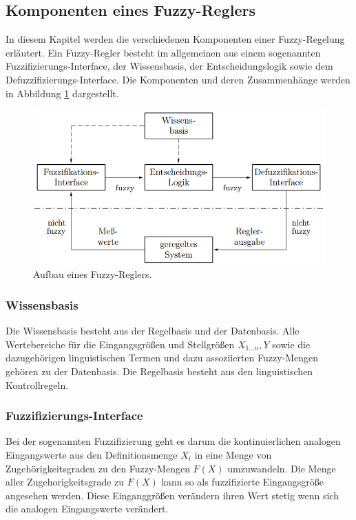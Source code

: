 \documentclass[12pt,a4paper,bibliography=totocnumbered,listof=totocnumbered, abstracton]{scrartcl}
\theoremstyle{Umgebung}
\begin{document}
\subsection{Komponenten eines Fuzzy-Reglers}

In diesem Kapitel werden die verschiedenen Komponenten einer Fuzzy-Regelung erläutert. Ein Fuzzy-Regler besteht im allgemeinen aus einem sogenannten Fuzzifizierungs-Interface, der Wissensbasis, der Entscheidungslogik sowie dem Defuzzifizierungs-Interface. Die Komponenten und deren Zusammenhänge werden in Abbildung \ref{fig:fuzzyregler} dargestellt.

\begin{figure}
	\centering
	\includegraphics[width=0.7\linewidth]{img/fuzzyregler}
	\caption{Aufbau eines Fuzzy-Reglers.}
	\label{fig:fuzzyregler}
\end{figure}

\subsubsection{Wissensbasis}

Die Wissensbasis besteht aus der Regelbasis und der Datenbasis. Alle Wertebereiche für die Eingangsgrößen und Stellgrößen $X_ {1...n}, Y$ sowie die dazugehörigen linguistischen Termen und dazu assoziierten Fuzzy-Mengen gehören zu der Datenbasis. Die Regelbasis besteht aus den linguistischen Kontrollregeln.

\subsubsection{Fuzzifizierungs-Interface}

Bei der sogenannten Fuzzifizierung geht es darum die kontinuierlichen analogen Eingangswerte aus den Definitionsmenge $X_i$ in eine Menge von Zugehörigkeitsgraden zu den Fuzzy-Mengen $F(X)$ umzuwandeln. Die Menge aller Zugehorigkeitsgrade zu $F(X)$ kann so als fuzzifizierte Eingangsgröße angesehen werden. Diese Einganggrößen verändern ihren Wert stetig wenn sich die analogen Eingangswerte verändert. 
\end{document}
